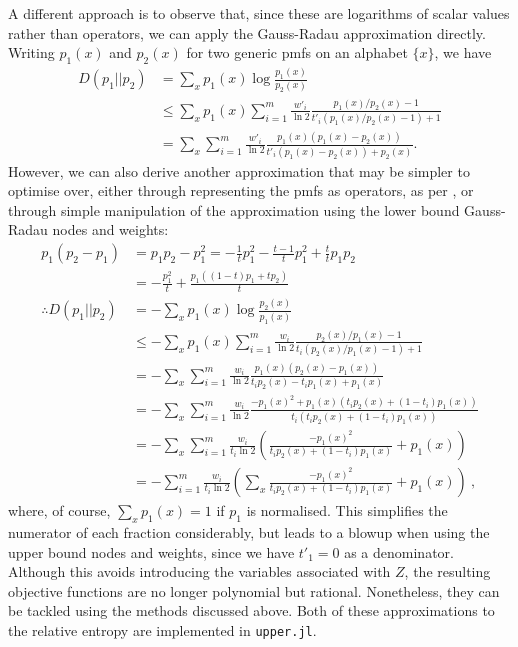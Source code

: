 \documentclass[10pt, a4paper]{article}
\numberwithin{equation}{section} %
\theoremstyle{definition}
\theoremstyle{plain}
\newcommand{\?}{\mathrel{?}} %
\begin{document}
                  A different approach is to observe that, since these are logarithms of scalar values rather than operators, we can apply the Gauss-Radau approximation directly. Writing \(p_1(x)\) and \(p_2(x)\) for two generic pmfs on an alphabet \(\{x\}\), we have
                  \begin{align}
                    D(p_1||p_2) &= \sum_x p_1(x) \log \frac{p_1(x)}{p_2(x)} \\
                                &\leq \sum_x p_1(x) \sum_{i=1}^m \frac{w'_i}{\ln 2} \frac{p_1(x)/p_2(x) - 1}{t'_i (p_1(x)/p_2(x)-1) + 1} \\
                                &= \sum_x \sum_{i=1}^m \frac{w'_i}{\ln 2} \frac{p_1(x)(p_1(x) - p_2(x))}{t'_i (p_1(x)- p_2(x)) + p_2(x)}.
                  \end{align}
                  However, we can also derive another approximation that may be simpler to optimise over, either through representing the pmfs as operators, as per , or through simple manipulation of the approximation using the lower bound Gauss-Radau nodes and weights:
                  \begin{align}
                    p_1(p_2-p_1) &= p_1p_2 - p_1^2  = -\frac{1}{t} p_1^2 - \frac{t-1}{t} p_1^2 + \frac{t}{t} p_1p_2 \\
                                 &= -\frac{p_1^2}{t} + \frac{p_1((1-t)p_1+tp_2)}{t}  \\
                    \therefore D(p_1||p_2) &= -\sum_x p_1(x) \log \frac{p_2(x)}{p_1(x)} \\
                                           &\leq -\sum_x p_1(x) \sum_{i=1}^m \frac{w_i}{\ln 2} \frac{p_2(x)/p_1(x) - 1}{t_i (p_2(x)/p_1(x)-1) + 1} \\
                                           &= -\sum_x \sum_{i=1}^m \frac{w_i}{\ln 2} \frac{p_1(x) (p_2(x) - p_1(x))}{t_i p_2(x) - t_i p_1(x) + p_1(x)} \\
                                           &= -\sum_x \sum_{i=1}^m \frac{w_i}{\ln 2} \frac{-{p_1(x)}^2 + p_1(x)(t_i p_2(x) + (1-t_i) p_1(x))}{t_i (t_i p_2(x) + (1-t_i) p_1(x)) } \\
                                           &= -\sum_x \sum_{i=1}^m \frac{w_i}{t_i \ln 2}\left( \frac{-{p_1(x)}^2}{t_i p_2(x) + (1-t_i) p_1(x)} + p_1(x) \right)\\
                                           &= -\sum_{i=1}^m \frac{w_i}{t_i \ln 2}\left( \sum_x \frac{-{p_1(x)}^2}{t_i p_2(x) + (1-t_i) p_1(x)} + p_1(x) \right)~\label{eqn:logratbound},
                  \end{align}
                  where, of course, \(\sum_x p_1(x) = 1\) if \(p_1\) is normalised. This simplifies the numerator of each fraction considerably, but leads to a blowup when using the upper bound nodes and weights, since we have \(t'_1 = 0\) as a denominator. Although this avoids introducing the variables associated with \(Z\), the resulting objective functions are no longer polynomial but rational. Nonetheless, they can be tackled using the methods discussed above. Both of these approximations to the relative entropy are implemented in \verb`upper.jl`.
\end{document}
